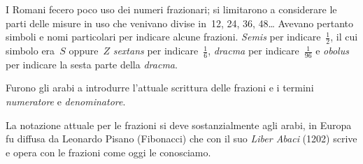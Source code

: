 I Romani fecero poco uso dei numeri frazionari; si limitarono a considerare
le parti delle misure in uso che venivano divise in~12, 24, 36, 48\ldots
Avevano pertanto simboli e nomi particolari per indicare alcune frazioni.
\emph{Semis} per indicare~\(\frac{1}{2}\), il cui simbolo era~\(S\)
oppure~\(Z\)
\emph{sextans} per indicare~\(\frac{1}{6}\), \emph{dracma} per
indicare~\(\frac{1}{96}\) e \emph{obolus} per indicare la sesta parte della
\emph{dracma}.

Furono gli arabi a introdurre l'attuale scrittura delle
frazioni e i termini \emph{numeratore} e \emph{denominatore}.

La notazione attuale per le frazioni si deve sostanzialmente agli arabi,
in Europa fu diffusa da Leonardo Pisano (Fibonacci) che con il suo
\emph{Liber Abaci} (1202) scrive e opera con le frazioni come oggi le
conosciamo.


